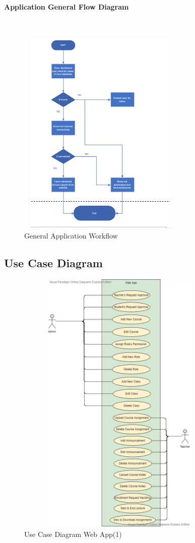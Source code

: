 \documentclass[12pt]{article}
\begin{document}
\paragraph{Application General Flow Diagram}\mbox{}\\
\begin{figure}[h]
\begin{center}
\includegraphics[width=8cm, height=10cm]{applicationworkflow}
\caption{General Application Workflow}
\end{center}
\end{figure}

\newpage
\subsection{Use Case Diagram}
\mbox\\
\mbox\\
\begin{figure}[h]
\begin{center}
\includegraphics[width=10cm, height=13cm]{DBMUseCaseWebAppPart1}
\caption{Use Case Diagram Web App(1)}
\end{center}
\end{figure}
\end{document}
